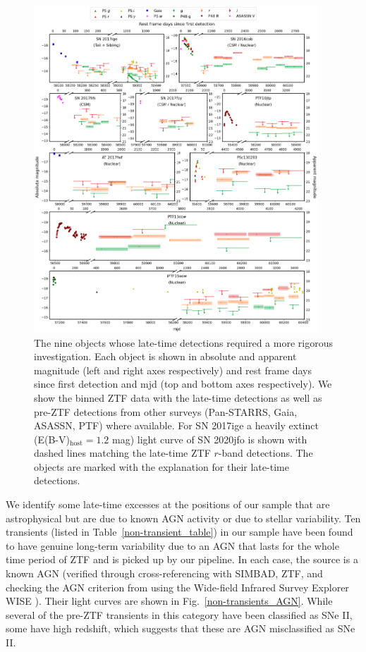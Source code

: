\documentclass[a4paper,oneside,12pt, class=Latex/Classes/PhDthesisPSnPDF, crop=false]{standalone}
\begin{document}
\begin{figure}
    \centering
    \includegraphics[width=0.95\textwidth]{../Images/chapter_4/weirdos.png}
    \caption{The nine objects whose late-time detections required a more rigorous investigation. Each object is shown in absolute and apparent magnitude (left and right axes respectively) and rest frame days since first detection and mjd (top and bottom axes respectively). We show the binned ZTF data with the late-time detections as well as pre-ZTF detections from other surveys (Pan-STARRS, Gaia, ASASSN, PTF) where available. For SN 2017ige a heavily extinct (E(B-V)$_\text{host}=1.2$ mag) light curve of SN 2020jfo is shown with dashed lines matching the late-time ZTF $r$-band detections. The objects are marked with the explanation for their late-time detections.}
    \label{weirdo_plots}
\end{figure}


We identify some late-time excesses at the positions of our sample that are astrophysical but are due to known AGN activity or due to stellar variability. Ten transients (listed in Table~\ref{non-transient_table}) in our sample have been found to have genuine long-term variability due to an AGN that lasts for the whole time period of ZTF and is picked up by our pipeline. In each case, the source is a known AGN (verified through cross-referencing with SIMBAD, ZTF, and checking the AGN criterion from \citealt{WISE_crit} using the Wide-field Infrared Survey Explorer WISE \citealt{WISE}). Their light curves are shown in Fig.~\ref{non-transients_AGN}. While several of the pre-ZTF transients in this category have been classified as SNe II, some have high redshift, which suggests that these are AGN misclassified as SNe II.
\end{document}
